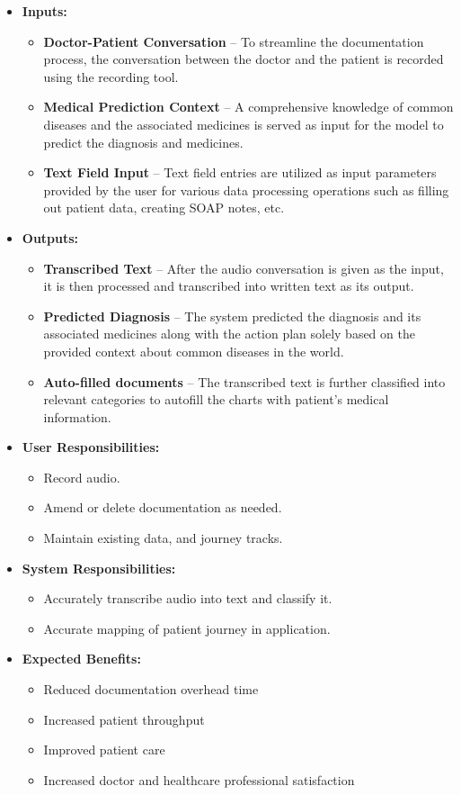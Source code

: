 \documentclass[12pt]{article}
\begin{document}
\begin{itemize}
  \item \textbf{Inputs:}
  \begin{itemize}
    \item \textbf{Doctor-Patient Conversation} -- To streamline the documentation process, the conversation between the doctor and the patient is recorded using the recording tool.
    \item \textbf{Medical Prediction Context} -- A comprehensive knowledge of common diseases and the associated medicines is served as input for the model to predict the diagnosis and medicines.
    \item \textbf{Text Field Input} -- Text field entries are utilized as input parameters provided by the user for various data processing operations such as filling out patient data, creating SOAP notes, etc.
  \end{itemize}
  \item \textbf{Outputs:}
  \begin{itemize}
    \item \textbf{Transcribed Text} -- After the audio conversation is given as the input, it is then processed and transcribed into written text as its output.
    \item \textbf{Predicted Diagnosis} -- The system predicted the diagnosis and its associated medicines along with the action plan solely based on the provided context about common diseases in the world.  
    \item \textbf{Auto-filled documents} -- The transcribed text is further classified into relevant categories to autofill the charts with patient's medical information.
  \end{itemize}
  \item \textbf{User Responsibilities:}
  \begin{itemize}
    \item Record audio.
    \item Amend or delete documentation as needed.
    \item Maintain existing data, and journey tracks.
  \end{itemize}
  \item \textbf{System Responsibilities:}
  \begin{itemize}
    \item Accurately transcribe audio into text and classify it.
    \item Accurate mapping of patient journey in application.
  \end{itemize}

\item{\textbf{Expected Benefits:}}

\begin{itemize}
  \item Reduced documentation overhead time
  \item Increased patient throughput
  \item Improved patient care
  \item Increased doctor and healthcare professional satisfaction
\end{itemize}
\end{itemize}
\end{document}
